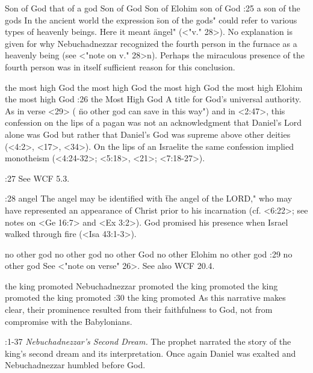     {Son of God} %
    {that of a god} %
    {Son of God} %
    {Son of Elohim} %
    {son of God} %
:25 {a son of the gods} In the ancient world the expression \"son of the gods" could refer to various types
of heavenly beings. Here it meant \"angel" (<"v." 28>). No explanation is given for why Nebuchadnezzar
recognized the fourth person in the furnace as a heavenly being (see <"note on v." 28>n). Perhaps the
miraculous presence of the fourth person was in itself sufficient reason for this conclusion.

    {the most high God} %
    {the most high God} %
    {the most high God} %
    {the most high Elohim} %
    {the most high God} %
:26 {the Most High God} A title for God's universal authority. As in verse <29> ( \"no other god can save in
this way") and in <2:47>, this confession on the lips of a pagan was not an acknowledgment that
Daniel's Lord alone was God but rather that Daniel's God was supreme above other deities
(<4:2>, <17>, <34>). On the lips of an Israelite the same confession implied monotheism (<4:24-32>;
<5:18>, <21>; <7:18-27>).  

:27 {}  See WCF 5.3.

:28 {angel} The angel may be identified with \"the angel of the 
LORD," who may have represented an appearance of Christ prior 
to his incarnation (cf. <6:22>; see notes on <Ge 16:7> and <Ex 3:2>). God 
promised his presence when Israel walked through fire (<Isa 43:1-3>).

    {no other god} %
    {no other god} %
    {no other God} %
    {no other Elohim} %
    {no other god} %
:29 {no other god} See <"note on verse" 26>. See also WCF 20.4.

    {the king promoted} %
    {Nebuchadnezzar promoted} %
    {the king promoted} %
    {the king promoted} %
    {the king promoted} %
:30 {the king promoted} As this narrative makes clear, their 
prominence resulted from their faithfulness to God, not from compromise with the Babylonians. 

:1-37 {} {\it Nebuchadnezzar's Second Dream.\/} The prophet narrated 
the story of the king's second dream and its interpretation. Once 
again Daniel was exalted and Nebuchadnezzar humbled before 
God.

